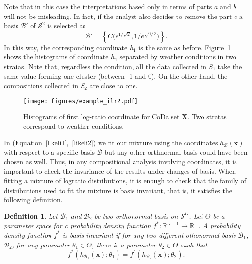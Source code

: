 \documentclass[12pt, a4paper]{article}
\newtheorem{definition}{Definition}
\begin{document}
Note that in this case the interpretations based only in terms of parts $a$ and $b$ will not be misleading. In fact, if the analyst also decides to remove the part $c$ a basis $\mathcal{B}'$ of $\mathcal{S}^2$ is selected as
\[
\mathcal{B}' = \left\{ C\Big( e^{1/\sqrt{2}}, 1/e^{\sqrt{1/2}} \Big) \right\}.
\]
In this way, the corresponding coordinate $h_1$ is the same as before. Figure~\ref{example_ilr2} 
shows the histograms of coordinate $h_1$ separated by weather conditions in two stratas. Note that, regardless the condition, all the data collected in $S_1$ take the same value forming one cluster (between -1 and 0). On the other hand, the compositions collected in $S_2$ are close to one.

\begin{figure}[thbp]
\centering
\texttt{[image: figures/example\_ilr2.pdf]}
\caption{Histograms of first log-ratio coordinate for CoDa set $\mathbf{X}$. Two stratas correspond to weather conditions.}\label{example_ilr2}
\end{figure}
% 

In (Equation~\ref{likeli1},~\ref{likeli2}) we fit our mixture using the coordinates $h_\mathcal{B}(\textbf{x})$ with respect to a specific basis $\mathcal{B}$ but any other orthnormal basis could have been chosen as well. Thus, in any compositional analysis involving coordinates, it is important to check the invariance of the results under changes of basis. When fitting a mixture of logratio distributions, it is enough to check that the family of distributions used to fit the mixture is basis invariant, that is, it satisfies the following definition. 

\begin{definition}
Let $\mathcal{B}_1$ and $\mathcal{B}_2$ be two orthonormal basis on $\mathcal{S}^D$. Let $\Theta$ be a parameter space for a probability density function $f^*: \mathbb{R}^{D-1} \rightarrow \mathbb{R}^+$. 
A probability density function $f^*$ is \emph{basis invariant} if for any two different othonormal basis $\mathcal{B}_1$, $\mathcal{B}_2$, for any parameter $\theta_1 \in \Theta$, there is a parameter $\theta_2 \in \Theta$ such that
\[
f^*(h_{\mathcal{B}_1}(\textbf{x}); \theta_1) = f^*(h_{\mathcal{B}_2}(\textbf{x}); \theta_2).
\]
\end{definition}
\end{document}
